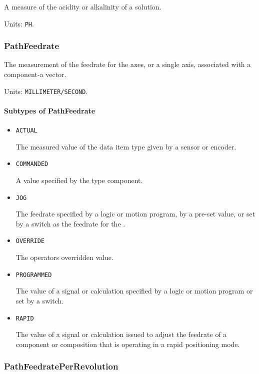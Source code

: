 A measure of the acidity or alkalinity of a solution.


Units: \texttt{PH}.

\subsubsection{PathFeedrate}
\label{sec:PathFeedrate}



The measurement of the feedrate for the axes, or a single axis, associated with a  component-a vector.


Units: \texttt{MILLIMETER/SECOND}.

\paragraph{Subtypes of PathFeedrate}\mbox{}
\label{sec:Subtypes of PathFeedrate}

\begin{itemize}

\item \texttt{ACTUAL}


The measured value of the data item type given by a sensor or encoder.

\item \texttt{COMMANDED}


A value specified by the  type component.

\item \texttt{JOG}


The feedrate specified by a logic or motion program, by a pre-set value, or set by a switch as the feedrate for the . 

\item \texttt{OVERRIDE}


The operators overridden value.

\item \texttt{PROGRAMMED}


The value of a signal or calculation specified by a logic or motion program or set by a switch.

\item \texttt{RAPID}


The value of a signal or calculation issued to adjust the feedrate of a component or composition that is operating in a rapid positioning mode.


\end{itemize}

\subsubsection{PathFeedratePerRevolution}
\label{sec:PathFeedratePerRevolution}



